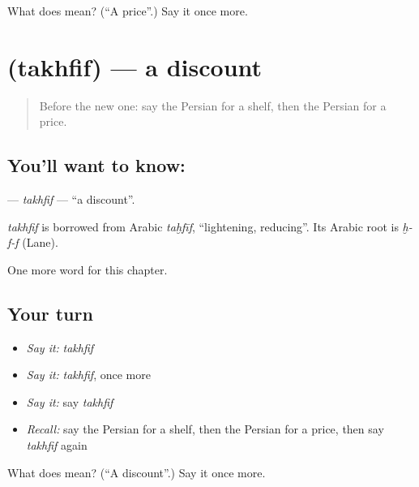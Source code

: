 \begin{tcolorbox}[breakable,colback=teal!4,colframe=teal!35!black,title={Before you move on}]
What does  mean? (\textquotedblleft{}A price\textquotedblright{}.) Say it once more.
\end{tcolorbox}
\section[\texorpdfstring{\fa{تخفیف} (takhfif)}{تخفیف (takhfif)}]{ (takhfif) — a discount}

\label{lesson:FA-C274-takhfif}



\begin{quote}
Before the new one: say the Persian for a shelf, then the Persian for a price.
\end{quote}

\subsection*{You'll want to know: }
\textbf{} — \emph{takhfif} — \textquotedblleft{}a discount\textquotedblright{}.

\begin{cousinweb}
\emph{takhfif} is borrowed from Arabic \emph{taḫfīf}, \textquotedblleft{}lightening, reducing\textquotedblright{}. Its Arabic root is \emph{ḫ-f-f} (Lane).
\end{cousinweb}

\begin{grammarlens}[title={What you've built}]
One more word for this chapter.
\end{grammarlens}

\subsection*{Your turn}
\begin{itemize}
\raggedright
  \item \emph{Say it:} \emph{takhfif}
  \item \emph{Say it:} \emph{takhfif}, once more
  \item \emph{Say it:} say \emph{takhfif}
  \item \emph{Recall:} say the Persian for a shelf, then the Persian for a price, then say \emph{takhfif} again
\end{itemize}

\begin{tcolorbox}[breakable,colback=teal!4,colframe=teal!35!black,title={Before you move on}]
What does  mean? (\textquotedblleft{}A discount\textquotedblright{}.) Say it once more.
\end{tcolorbox}

